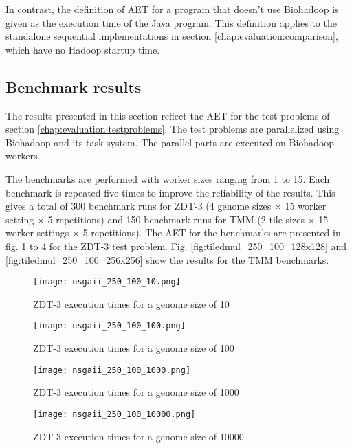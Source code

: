 In contrast, the definition of AET for a program that doesn't use Biohadoop is given as the execution time of the Java program. This definition applies to the standalone sequential implementations in section \ref{chap:evaluation:comparison}, which have no Hadoop startup time.

\subsection{Benchmark results}
The results presented in this section reflect the AET for the test problems of section \ref{chap:evaluation:testproblems}. The test problems are parallelized using Biohadoop and its task system. The parallel parts are executed on Biohadoop workers.

The benchmarks are performed with worker sizes ranging from 1 to 15. Each benchmark is repeated five times to improve the reliability of the results. This gives a total of 300 benchmark runs for ZDT-3 (4 genome sizes $\times$ 15 worker setting $\times$ 5 repetitions) and 150 benchmark runs for TMM (2 tile sizes $\times$ 15 worker settings $\times$ 5 repetitions). The AET for the benchmarks are presented in fig. \ref{fig:nsga_250_100_10} to \ref{fig:nsga_250_100_10000} for the ZDT-3 test problem. Fig. \ref{fig:tiledmul_250_100_128x128} and \ref{fig:tiledmul_250_100_256x256} show the results for the TMM benchmarks.

\begin{figure}
  \centering
  \texttt{[image: nsgaii\_250\_100\_10.png]}
  \caption[ZDT-3 execution times for a genome size of 10]{ZDT-3 execution times for a genome size of 10}
  \label{fig:nsga_250_100_10}
\end{figure}
\begin{figure}
  \centering
  \texttt{[image: nsgaii\_250\_100\_100.png]}
  \caption[ZDT-3 execution times for a genome size of 100]{ZDT-3 execution times for a genome size of 100}
  \label{fig:nsga_250_100_100}
\end{figure}
\begin{figure}
  \centering
  \texttt{[image: nsgaii\_250\_100\_1000.png]}
  \caption[ZDT-3 execution times for a genome size of 1000]{ZDT-3 execution times for a genome size of 1000}
  \label{fig:nsga_250_100_1000}
\end{figure}
\begin{figure}
  \centering
  \texttt{[image: nsgaii\_250\_100\_10000.png]}
  \caption[ZDT-3 execution times for a genome size of 10000]{ZDT-3 execution times for a genome size of 10000}
  \label{fig:nsga_250_100_10000}
\end{figure}

